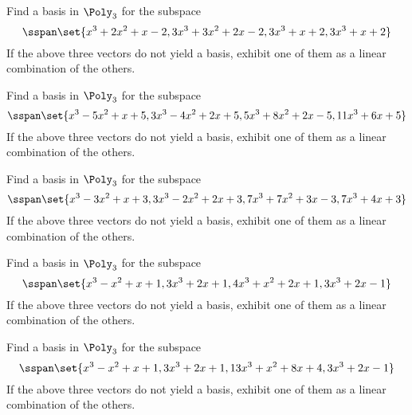 \begin{enumialphparenastyle}
\begin{ex} Find a basis in $\Poly_{3}$ for the subspace 
\begin{equation*}
\sspan\set{
x^{3}+2x^{2}+x-2,3x^{3}+3x^{2}+2x-2,3x^{3}+x+2,3x^{3}+x+2}
\end{equation*}
If the above three vectors do not yield a basis, exhibit one of them as a
linear combination of the others.
\end{ex}


\begin{ex} Find a basis in $\Poly_{3}$ for the subspace 
\begin{equation*}
\sspan\set{
x^{3}-5x^{2}+x+5,3x^{3}-4x^{2}+2x+5,5x^{3}+8x^{2}+2x-5,11x^{3}+6x+5}
\end{equation*}
If the above three vectors do not yield a basis, exhibit one of them as a
linear combination of the others.
\end{ex}


\begin{ex} Find a basis in $\Poly_{3}$ for the subspace 
\begin{equation*}
\sspan\set{
x^{3}-3x^{2}+x+3,3x^{3}-2x^{2}+2x+3,7x^{3}+7x^{2}+3x-3,7x^{3}+4x+3}
\end{equation*}
If the above three vectors do not yield a basis, exhibit one
of them as a linear combination of the others.
\end{ex}


\begin{ex} Find a basis in $\Poly_{3}$ for the subspace 
\begin{equation*}
\sspan\set{
x^{3}-x^{2}+x+1,3x^{3}+2x+1,4x^{3}+x^{2}+2x+1,3x^{3}+2x-1}
\end{equation*}
If the above three vectors do not yield a basis, exhibit one
of them as a linear combination of the others.
\end{ex}


\begin{ex} Find a basis in $\Poly_{3}$ for the subspace 
\begin{equation*}
\sspan\set{
x^{3}-x^{2}+x+1,3x^{3}+2x+1,13x^{3}+x^{2}+8x+4,3x^{3}+2x-1}
\end{equation*}
If the above three vectors do not yield a basis, exhibit one
of them as a linear combination of the others.
\end{ex}



\end{enumialphparenastyle}
